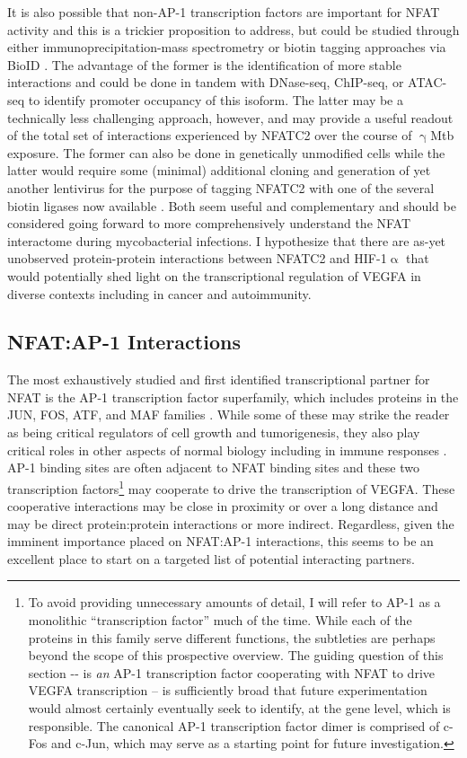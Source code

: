 It is also possible that non\hyp{}AP\hyp{}1 transcription factors are important for NFAT activity and this is a trickier proposition to address, but could be studied through either immunoprecipitation\hyp{}mass spectrometry or biotin tagging approaches via BioID \citep{Roux2012}. The advantage of the former is the identification of more stable interactions and could be done in tandem with DNase\hyp{}seq, ChIP\hyp{}seq, or ATAC\hyp{}seq to identify promoter occupancy of this isoform. The latter may be a technically less challenging approach, however, and may provide a useful readout of the total set of interactions experienced by NFATC2 over the course of $\upgamma$Mtb exposure. The former can also be done in genetically unmodified cells while the latter would require some (minimal) additional cloning and generation of yet another lentivirus for the purpose of tagging NFATC2 with one of the several biotin ligases now available \citep{Cho2020}. Both seem useful and complementary and should be considered going forward to more comprehensively understand the NFAT interactome during mycobacterial infections. I hypothesize that there are as\hyp{}yet unobserved protein\hyp{}protein interactions between NFATC2 and HIF\hyp{}1$\upalpha$ that would potentially shed light on the transcriptional regulation of VEGFA in diverse contexts including in cancer and autoimmunity. 

\subsection{NFAT:AP\hyp{}1 Interactions}\label{nfatap1}

The most exhaustively studied and first identified transcriptional partner for NFAT is the AP\hyp{}1 transcription factor superfamily, which includes proteins in the JUN, FOS, ATF, and MAF families \citep{Boise1993}. While some of these may strike the reader as being critical regulators of cell growth and tumorigenesis, they also play critical roles in other aspects of normal biology including in immune responses \citep{Macian2001, Eferl2003}. AP\hyp{}1 binding sites are often adjacent to NFAT binding sites and these two transcription factors\footnote{To avoid providing unnecessary amounts of detail, I will refer to AP\hyp{}1 as a monolithic ``transcription factor'' much of the time. While each of the proteins in this family serve different functions, the subtleties are perhaps beyond the scope of this prospective overview. The guiding question of this section \hyp{}\hyp{} is \textit{an} AP\hyp{}1 transcription factor cooperating with NFAT to drive VEGFA transcription -- is sufficiently broad that future experimentation would almost certainly eventually seek to identify, at the gene level, which is responsible. The canonical AP\hyp{}1 transcription factor dimer is comprised of c\hyp{}Fos and c\hyp{}Jun, which may serve as a starting point for future investigation.} may cooperate to drive the transcription of VEGFA. These cooperative interactions may be close in proximity or over a long distance and may be direct protein:protein interactions or more indirect. Regardless, given the imminent importance placed on NFAT:AP\hyp{}1 interactions, this seems to be an excellent place to start on a targeted list of potential interacting partners.

